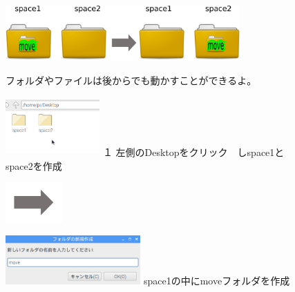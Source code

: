 \documentclass[a4paper,12pt]{jarticle}
\begin{document}
\begin{figure}[ht]
  \centering
  \includegraphics[width=0.8\textwidth]{fig15-1.eps}
  \begin{minipage}{15.297cm}
    フォルダやファイルは後からでも動かすことができるよ。
  \end{minipage}

  \begin{minipage}{5.963cm}
    \includegraphics[width=3.604cm,height=2.268cm]{textbook-img051.png}
    {\flushleft
      １
      左側のDesktopをクリック　しspace1とspace2を作成
    }
  \end{minipage}
  \includegraphics[width=2.168cm,height=1.542cm]{textbook-img052.png}
  \begin{minipage}{7.473cm}
    \includegraphics[width=5.166cm,height=1.882cm]{textbook-img050.png}
    { space1の中にmoveフォルダを作成
    }
  \end{minipage}


\end{figure}
\end{document}
